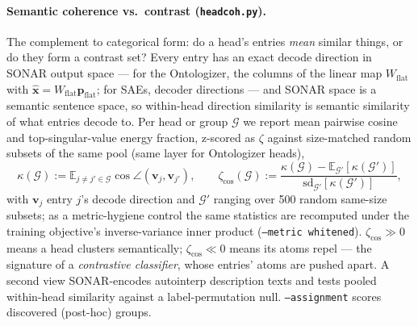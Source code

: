 \paragraph{Semantic coherence vs.\ contrast (\texttt{headcoh.py}).}
The complement to categorical form: do a head's entries \emph{mean}
similar things, or do they form a contrast set? Every entry has an exact
decode direction in SONAR output space --- for the Ontologizer, the columns
of the linear map $W_{\mathrm{flat}}$ with
$\hat{\mathbf{x}} = W_{\mathrm{flat}}\mathbf{p}_{\mathrm{flat}}$; for SAEs,
decoder directions --- and SONAR space is a semantic sentence space, so
within-head direction similarity is semantic similarity of what entries
decode to. Per head or group $\mathcal{G}$ we report mean pairwise cosine
and top-singular-value energy fraction, z-scored as $\zeta$ against
size-matched random subsets of the same pool (same layer for Ontologizer
heads),
\begin{equation}
	\kappa(\mathcal{G}) := \mathbb{E}_{j \neq j' \in \mathcal{G}}\cos\angle(\mathbf{v}_j, \mathbf{v}_{j'}),
	\qquad
	\zeta_{\cos}(\mathcal{G}) := \frac{\kappa(\mathcal{G}) - \mathbb{E}_{\mathcal{G}'}[\kappa(\mathcal{G}')]}{\mathrm{sd}_{\mathcal{G}'}[\kappa(\mathcal{G}')]},
	\label{eq:zcos}
\end{equation}
with $\mathbf{v}_j$ entry $j$'s decode direction and $\mathcal{G}'$ ranging
over 500 random same-size subsets; as a metric-hygiene control the same
statistics are recomputed under the training objective's inverse-variance
inner product (\texttt{--metric whitened}). $\zeta_{\cos} \gg 0$ means a
head clusters semantically; $\zeta_{\cos} \ll 0$ means its atoms repel --- the signature of a
\emph{contrastive classifier}, whose entries' atoms are pushed apart. A
second view SONAR-encodes autointerp description texts and tests pooled
within-head similarity against a label-permutation null.
\texttt{--assignment} scores discovered (post-hoc) groups.

